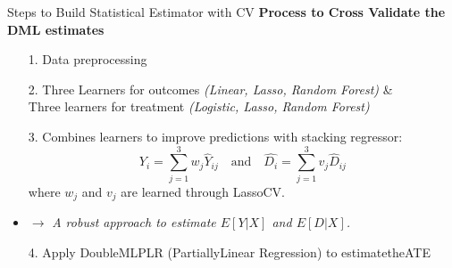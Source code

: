 \documentclass[aspectratio=169]{beamer}
\begin{document}
\begin{frame}{Steps to Build Statistical Estimator with CV}
\textbf{Process to Cross Validate the DML estimates}
\begin{itemize}
    \item[1.] Data preprocessing
    \item[2.] Three Learners for outcomes \textit{(Linear, Lasso, Random Forest)} \& \\ Three learners for treatment \textit{(Logistic, Lasso, Random Forest)}
    \item[3.] Combines learners to improve predictions with stacking regressor: 
    	\[         \hat{Y_i} = \sum_{j=1}^{3} w_j \hat{Y}_{ij}      \text{  }  \text{ and } \text{  }  \hat{D_i} = \sum_{j=1}^{3} v_j \hat{D}_{ij}         \] 
    where \( w_j \)  and \( v_j \) are learned through LassoCV. \\
        \item $\rightarrow$ \textit{A robust approach to estimate \( E[Y|X] \) and \( E[D|X] \).}
        \item[4.] Apply DoubleMLPLR (PartiallyLinear Regression) to estimatetheATE
\end{itemize}
    
\end{frame}
\end{document}

